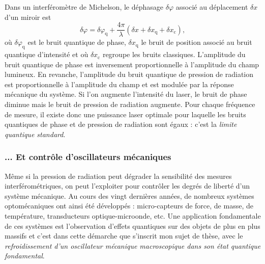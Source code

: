 \documentclass[12pt,a4paper]{article}
\begin{document}
Dans un interféromètre de Michelson, le déphasage $\delta\varphi$ associé au déplacement $\delta x$ d'un miroir est
\begin{equation}
\delta \varphi = \delta \varphi_\mathrm{q} + \frac{4\pi}{\lambda} ( \delta x + \delta x_\mathrm{q} + \delta x_\mathrm{c}),
\label{eq:disp}
\end{equation}
où $\delta \varphi_\mathrm{q}$ est le bruit quantique de phase, $\delta x_\mathrm{q}$ le bruit de position associé au bruit quantique d'intensité et où $\delta x_\mathrm{c}$ regroupe les bruits classiques.
L'amplitude du bruit quantique de phase est inversement proportionnelle à l'amplitude du champ lumineux.
En revanche, l'amplitude du bruit quantique de pression de radiation est proportionnelle à l'amplitude du champ et est modulée par la réponse mécanique du système.
Si l'on augmente l'intensité du laser, le bruit de phase diminue mais le bruit de pression de radiation augmente.
Pour chaque fréquence de mesure, il existe donc une puissance laser optimale pour laquelle les bruits quantiques de phase et de pression de radiation sont égaux : c'est la \textit{limite quantique standard}.

\subsubsection{... Et contrôle d'oscillateurs mécaniques}

Même si la pression de radiation peut dégrader la sensibilité des mesures interférométriques, on peut l'exploiter pour contrôler les degrés de liberté d'un système mécanique.
Au cours des vingt dernières années, de nombreux systèmes optomécaniques ont ainsi été développés : micro-capteurs de force, de masse, de température, transducteurs optique-microonde, etc.
Une application fondamentale de ces systèmes est l'observation d'effets quantiques sur des objets de plus en plus massifs et c'est dans cette démarche que s'inscrit mon sujet de thèse, avec le \textit{refroidissement d'un oscillateur mécanique macroscopique dans son état quantique fondamental}.
\end{document}
